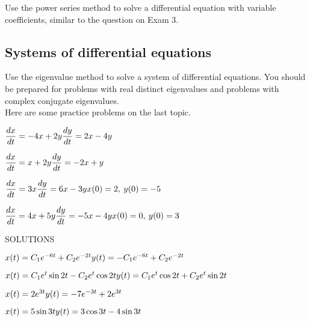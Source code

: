 \documentclass[12pt]{exam}
\begin{document}
Use the power series method to solve a differential equation with variable coefficients, similar to the question on Exam 3.

\subsection*{Systems of differential equations}

Use the eigenvalue method to solve a system of differential equations.  You should be prepared for problems with real distinct eigenvalues and problems with complex conjugate eigenvalues. \\

Here are some practice problems on the last topic.

\begin{questions}

\question
$\dfrac{dx}{dt} = -4x + 2y \smallskip \\ \dfrac{dy}{dt} = 2x - 4y$

\clearpage

\question
$\dfrac{dx}{dt} = x + 2y \smallskip \\ \dfrac{dy}{dt} = -2x + y$

\question
$\dfrac{dx}{dt} = 3x \smallskip \\ \dfrac{dy}{dt} = 6x  -3y \smallskip \\ x(0) = 2, \> y(0) = -5$

\question
$\dfrac{dx}{dt} = 4x + 5y \smallskip \\ \dfrac{dy}{dt} = -5x - 4y \smallskip \\ x(0) = 0, \> y(0) = 3$

\end{questions}

\bigskip
SOLUTIONS

\begin{questions}
\question
$x(t) = C_1e^{-6t} + C_2 e^{-2t} \\
y(t) = -C_1e^{-6t} + C_2 e^{-2t}$

\question
$x(t) = C_1 e^t \sin 2t - C_2 e^t \cos 2t \\
y(t) = C_1 e^t \cos 2t + C_2 e^t \sin 2t$

\question
$x(t) = 2 e^{3t} \\
y(t) = -7 e^{-3t} + 2 e^{3t}$

\question
$x(t) = 5 \sin 3t \\
y(t) = 3 \cos 3t - 4 \sin 3t$

\end{questions}
\end{document}
